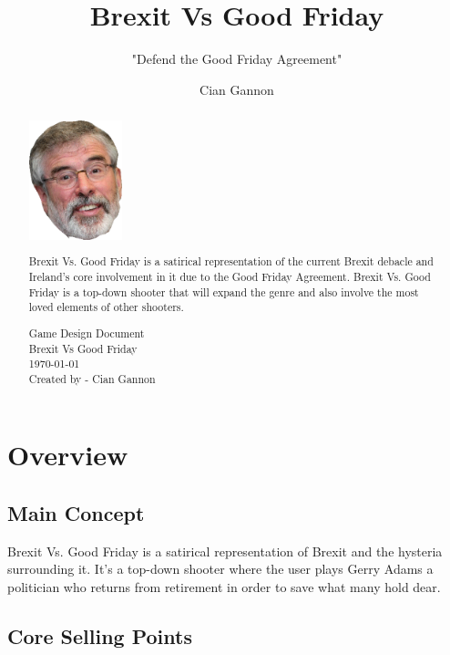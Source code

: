 \documentclass[a4paper]{scrreprt}
\title{Brexit Vs Good Friday}
\subtitle{"Defend the Good Friday Agreement"}
\author{Cian Gannon}
\begin{document}
\maketitle

\begin{abstract}

\centering

\includegraphics[width=2.7cm]{gerrylad}

Brexit Vs. Good Friday is a satirical representation of the current Brexit debacle and Ireland's core involvement in it due to the Good Friday Agreement. 
Brexit Vs. Good Friday is a top-down shooter that will expand the genre and also involve the most loved elements of other shooters.

\begin{flushleft}
\noindent
\null\vfill
Game Design Document \\
Brexit Vs Good Friday \\
\today \\
Created by - Cian Gannon
\end{flushleft}

\end{abstract}

\tableofcontents

\chapter{Overview}

\section{Main Concept}
Brexit Vs. Good Friday is a satirical representation of Brexit and the hysteria surrounding it. 
It's a top-down shooter where the user plays Gerry Adams a politician who returns from retirement in order to save what many hold dear.

\section{Core Selling Points}
\end{document}
